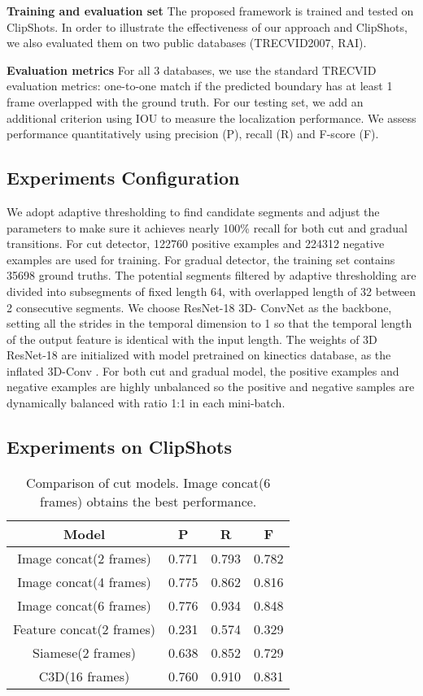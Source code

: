 \documentclass[runningheads]{llncs}
\begin{document}
\textbf{Training and evaluation set} The proposed framework is trained and tested on ClipShots. 
In order to illustrate the effectiveness of our approach and ClipShots, we also evaluated them on two public databases (TRECVID2007, RAI).

\textbf{Evaluation metrics} For all 3 databases, we use the standard TRECVID evaluation metrics: one-to-one match if the predicted boundary has at least 1 frame overlapped with the ground truth. For our testing set, we add an additional criterion using IOU to measure the localization performance. We assess performance quantitatively using precision (P), recall (R) and F-score (F). 

\subsection{Experiments Configuration}
We adopt adaptive thresholding to find candidate segments and adjust the parameters to make sure it achieves nearly 100\% recall for both cut and gradual transitions. For cut detector, 122760 positive examples and 224312 negative examples are used for training. For gradual detector, the training set contains 35698 ground truths. The potential segments filtered by adaptive thresholding are divided into subsegments of fixed length 64, with overlapped length of 32 between 2 consecutive segments. We choose ResNet-18 3D- ConvNet as the backbone, setting all the strides in the temporal dimension to 1 so that the temporal length of the output feature is identical with the input length. The weights of 3D ResNet-18 are initialized with model pretrained on kinectics database, as the inflated 3D-Conv \cite{carreira2017quo}. For both cut and gradual model, the positive examples and negative examples are highly unbalanced so the positive and negative samples are dynamically balanced with ratio 1:1 in each mini-batch.

\subsection{Experiments on ClipShots}

\begin{table}
\centering
\begin{tabular} {c|c|c|c}
\hline Model&P&R&F\\
\hline Image concat(2 frames)&0.771&0.793&0.782\\ 
\hline Image concat(4 frames)&0.775&0.862&0.816\\ 
\hline Image concat(6 frames)&0.776&0.934&0.848\\ 
\hline Feature concat(2 frames)&0.231&0.574&0.329\\ 
\hline Siamese(2 frames)&0.638&0.852&0.729\\ 
\hline C3D(16 frames)&0.760&0.910&0.831\\
\hline
\end{tabular}
\caption[Comparison of cut models]{Comparison of cut models. Image concat(6 frames) obtains the best performance.}\label{table:1}
\end{table}
\end{document}
